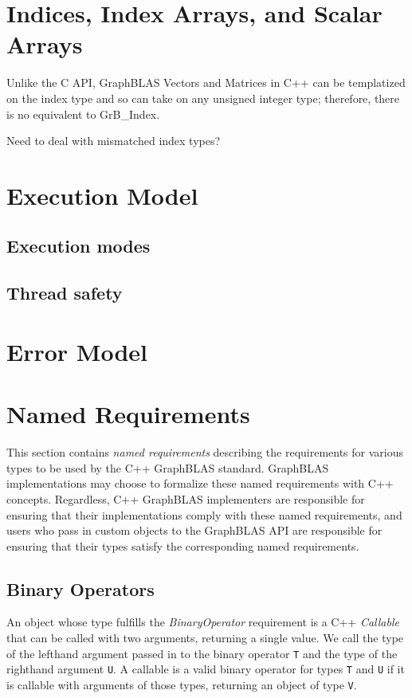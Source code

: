 \section{Indices, Index Arrays, and Scalar Arrays}

Unlike the C API, GraphBLAS Vectors and Matrices in C++ can be templatized on
the index type and so can take on any unsigned integer type; therefore, there is
no equivalent to GrB\_Index.

Need to deal with mismatched index types?

\section{Execution Model}

\subsection{Execution modes}

\subsection{Thread safety}
\label{Sec:ThreadSafety}


\section{Error Model}
\label{Sec:ErrorModel}


\section{Named Requirements}
This section contains \textit{named requirements} describing the requirements for
various types to be used by the C++ GraphBLAS standard.
GraphBLAS implementations may choose to formalize these named requirements with
C++ concepts.  Regardless, C++ GraphBLAS implementers are responsible for
ensuring that their implementations comply with these named requirements, and
users who pass in custom objects to the GraphBLAS API are responsible for
ensuring that their types satisfy the corresponding named requirements.

\subsection{Binary Operators}
An object whose type fulfills the \textit{BinaryOperator} requirement is a C++
\textit{Callable} that can be called with two arguments, returning a single
value.  We call the type of the lefthand argument passed in to the binary operator
\texttt{T} and the type of the righthand argument \texttt{U}.  A callable is a
valid binary operator for types \texttt{T} and \texttt{U} if it is callable with
arguments of those types, returning an object of type \texttt{V}.

